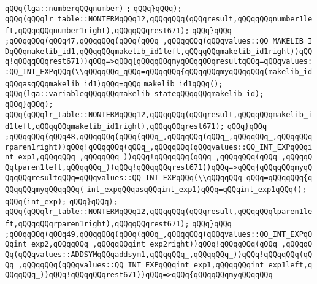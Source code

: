 \verb|qQQq(lga::numberqQQqnumber)|\newline
\verb|;|\newline
\verb|qQQq}qQQq);|\newline
\verb|qQQq(qQQqlr_table::NONTERMqQQq12,qQQqqQQq(qQQqresult,qQQqqQQqnumber1left,qQQqqQQqnumber1right),qQQqqQQqrest671);|\newline
\verb|qQQq}qQQq|\newline
\verb|;qQQqqQQq(qQQq47,qQQqqQQq(qQQq(qQQq_,qQQqqQQq(qQQqvalues::QQ_MAKELIB_IDqQQqmakelib_id1,qQQqqQQqmakelib_id1left,qQQqqQQqmakelib_id1right))qQQq!qQQqqQQqrest671))qQQq=>qQQq{qQQqqQQqmyqQQqqQQqresultqQQq=qQQqvalues::QQ_INT_EXPqQQq(\\qQQqqQQq_qQQq=qQQqqQQq{qQQqqQQqmyqQQqqQQq(makelib_idqQQqasqQQqmakelib_id1)qQQq=qQQq|\newline
\verb|makelib_id1qQQq();|\newline
\verb|qQQq(lga::variableqQQqqQQqmakelib_stateqQQqqQQqmakelib_id);|\newline
\verb|qQQq}qQQq);|\newline
\verb|qQQq(qQQqlr_table::NONTERMqQQq12,qQQqqQQq(qQQqresult,qQQqqQQqmakelib_id1left,qQQqqQQqmakelib_id1right),qQQqqQQqrest671);|\newline
\verb|qQQq}qQQq|\newline
\verb|;qQQqqQQq(qQQq48,qQQqqQQq(qQQq(qQQq_,qQQqqQQq(qQQq_,qQQqqQQq_,qQQqqQQqrparen1right))qQQq!qQQqqQQq(qQQq_,qQQqqQQq(qQQqvalues::QQ_INT_EXPqQQqint_exp1,qQQqqQQq_,qQQqqQQq_))qQQq!qQQqqQQq(qQQq_,qQQqqQQq(qQQq_,qQQqqQQqlparen1left,qQQqqQQq_))qQQq!qQQqqQQqrest671))qQQq=>qQQq{qQQqqQQqmyqQQqqQQqresultqQQq=qQQqvalues::QQ_INT_EXPqQQq(\\qQQqqQQq_qQQq=qQQqqQQq{qQQqqQQqmyqQQqqQQq(|\newline
\verb|int_expqQQqasqQQqint_exp1)qQQq=qQQqint_exp1qQQq();|\newline
\verb|qQQq(int_exp);|\newline
\verb|qQQq}qQQq);|\newline
\verb|qQQq(qQQqlr_table::NONTERMqQQq12,qQQqqQQq(qQQqresult,qQQqqQQqlparen1left,qQQqqQQqrparen1right),qQQqqQQqrest671);|\newline
\verb|qQQq}qQQq|\newline
\verb|;qQQqqQQq(qQQq49,qQQqqQQq(qQQq(qQQq_,qQQqqQQq(qQQqvalues::QQ_INT_EXPqQQqint_exp2,qQQqqQQq_,qQQqqQQqint_exp2right))qQQq!qQQqqQQq(qQQq_,qQQqqQQq(qQQqvalues::ADDSYMqQQqaddsym1,qQQqqQQq_,qQQqqQQq_))qQQq!qQQqqQQq(qQQq_,qQQqqQQq(qQQqvalues::QQ_INT_EXPqQQqint_exp1,qQQqqQQqint_exp1left,qQQqqQQq_))qQQq!qQQqqQQqrest671))qQQq=>qQQq{qQQqqQQqmyqQQqqQQq|\newline
